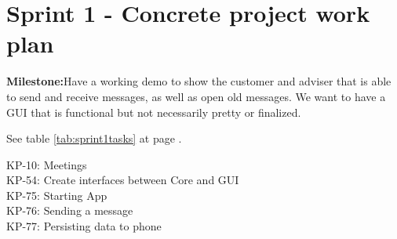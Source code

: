 \section{Sprint 1 - Concrete project work plan}

\textbf{Milestone:}Have a working demo to show the customer and adviser that is able to send and receive messages, as well as open old messages. We want to have a GUI that is functional but not necessarily pretty or finalized.

See table \ref{tab:sprint1tasks} at page \pageref{tab:sprint1tasks}.
\begin{table}
KP-10: Meetings \\ 
KP-54: Create interfaces between Core and GUI \\
KP-75: Starting App \\
KP-76: Sending a message\\
KP-77: Persisting data to phone\\


\end{table}
